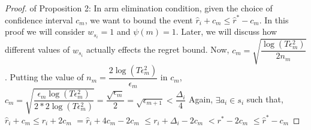 \begin{proof} of Proposition 2:
\newline In arm elimination condition, given the choice of confidence interval $c_{m}$, we want to bound the event $\hat{r}_{i}+c_{m}\leq \hat{r}^{*}-c_{m}$. In this proof we will consider $w_{s_{i}}=1$ and $\psi(m)=1$. Later, we will discuss how different values of $w_{s_{i}}$ actually effects the regret bound.
\newline Now, $c_{m}=\sqrt{\dfrac{\log (T\epsilon_{m}^{2})}{2 n_{m}}}$.
\newline Putting the value of $n_{m}=\dfrac{2\log{(T\epsilon_{m}^{2})}}{\epsilon_{m}}$ in $c_{m}$,
\newline $c_{m}=\sqrt{\dfrac{\epsilon_{m}\log (T\epsilon_{m}^{2})}{2*2 \log(T\epsilon_{m}^{2})}}=\dfrac{\sqrt{\epsilon_{m}}}{2} = \sqrt{\epsilon_{m+1}} < \dfrac{\Delta_{i}}{4} $
\newline Again, $\exists a_{i} \in s_{i}$ such that, 
$\hat{r}_{i} + c_{m}\leq r_{i} + 2c_{m} $
\newline\hspace*{14em}$= \hat{r}_{i} + 4c_{m} - 2c_{m} $
\newline\hspace*{14em}$\leq r_{i} + \Delta_{i} - 2c_{m}$
\newline\hspace*{14em}$< r^{*} -2c_{m} $
\newline\hspace*{14em}$\leq \hat{r}^{*} - c_{m}$

\end{proof}

